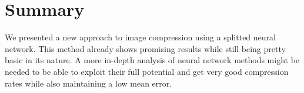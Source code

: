 \section{Summary} \label{sec:summary}
We presented a new approach to image compression using a splitted neural network. This method already shows promising results while still being pretty basic in its nature. A more in-depth analysis of neural network methods might be needed to be able to exploit their full potential and get very good compression rates while also maintaining a low mean error.
